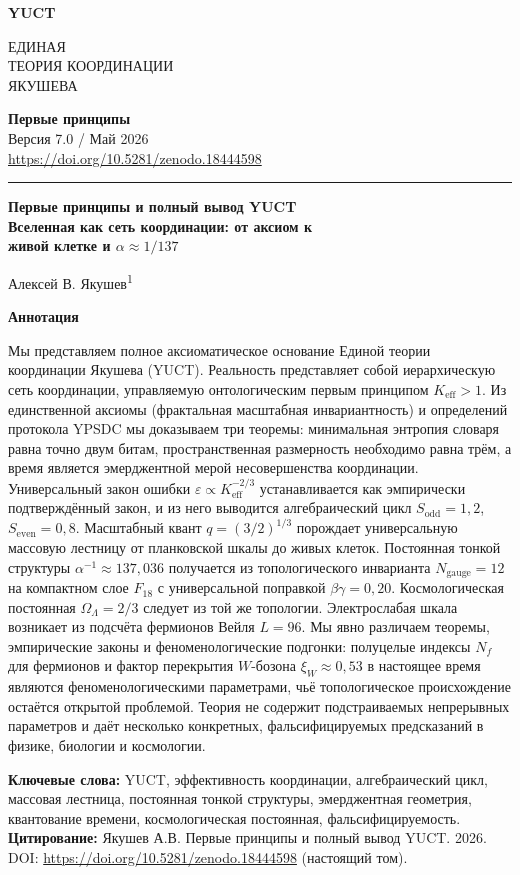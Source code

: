 \documentclass[12pt,a4paper]{article}
\newcommand{\makeheader}{%
	\noindent
	\begin{minipage}{0.17\textwidth}
		\raggedright
		{\sffamily\bfseries\color{skyblue}\fontsize{46}{46}\selectfont YUCT}%
	\end{minipage}%
	\hspace{30pt}
	\begin{minipage}{0.32\textwidth}
		\raggedright
		{\sffamily\fontsize{11}{13}\selectfont ЕДИНАЯ \\ ТЕОРИЯ КООРДИНАЦИИ\\ ЯКУШЕВА}%
	\end{minipage}%
	\hfill
	\begin{minipage}{0.38\textwidth}
		\raggedleft
		{\sffamily\bfseries Первые принципы}\\ 
		{\sffamily Версия 7.0 / Май 2026}\\ 
		{\sffamily\footnotesize \scriptsize \url{https://doi.org/10.5281/zenodo.18444598}}%
	\end{minipage}
	\par\vspace{5pt}
	\noindent\textcolor{gold}{\rule{\textwidth}{1.6pt}}
	\par\vspace{0pt}
}
\begin{document}
	
	\thispagestyle{firstpage}
	\makeheader
	
	\vspace{0cm}
	{\LARGE\bfseries Первые принципы и полный вывод YUCT \\
		\Large Вселенная как сеть координации: от аксиом к \\ живой клетке и \(\alpha \approx 1/137\) \par}
	\vspace{0.2cm}
	
	{\large Алексей В. Якушев\textsuperscript{1}} \\
	\vspace{0.0cm}
	
	{\color{darkblue}\textbf{\LARGE Аннотация}} \par
	{\large
		\noindent
		Мы представляем полное аксиоматическое основание Единой теории координации Якушева (YUCT). Реальность представляет собой иерархическую сеть координации, управляемую онтологическим первым принципом \(K_{\mathrm{eff}} > 1\). Из единственной аксиомы (фрактальная масштабная инвариантность) и определений протокола YPSDC мы доказываем три теоремы: минимальная энтропия словаря равна точно двум битам, пространственная размерность необходимо равна трём, а время является эмерджентной мерой несовершенства координации. Универсальный закон ошибки \(\varepsilon \propto K_{\mathrm{eff}}^{-2/3}\) устанавливается как эмпирически подтверждённый закон, и из него выводится алгебраический цикл \(S_{\mathrm{odd}} = 1,2\), \(S_{\mathrm{even}} = 0,8\). Масштабный квант \(q = (3/2)^{1/3}\) порождает универсальную массовую лестницу от планковской шкалы до живых клеток. Постоянная тонкой структуры \(\alpha^{-1} \approx 137,036\) получается из топологического инварианта \(N_{\mathrm{gauge}} = 12\) на компактном слое \(F_{18}\) с универсальной поправкой \(\beta\gamma = 0,20\). Космологическая постоянная \(\Omega_\Lambda = 2/3\) следует из той же топологии. Электрослабая шкала возникает из подсчёта фермионов Вейля \(L = 96\). Мы явно различаем теоремы, эмпирические законы и феноменологические подгонки: полуцелые индексы \(N_f\) для фермионов и фактор перекрытия \(W\)-бозона \(\xi_W \approx 0,53\) в настоящее время являются феноменологическими параметрами, чьё топологическое происхождение остаётся открытой проблемой. Теория не содержит подстраиваемых непрерывных параметров и даёт несколько конкретных, фальсифицируемых предсказаний в физике, биологии и космологии.
	}
	
	\vspace{0.1cm}
	\noindent
	{\color{darkblue}\textbf{Ключевые слова:}} YUCT, эффективность координации, алгебраический цикл, массовая лестница, постоянная тонкой структуры, эмерджентная геометрия, квантование времени, космологическая постоянная, фальсифицируемость.
	\vspace{0.1cm}
	\noindent
	{\color{darkblue}\textbf{Цитирование:}} Якушев А.В. Первые принципы и полный вывод YUCT. 2026. DOI: \url{https://doi.org/10.5281/zenodo.18444598} (настоящий том).
	
\end{document}
